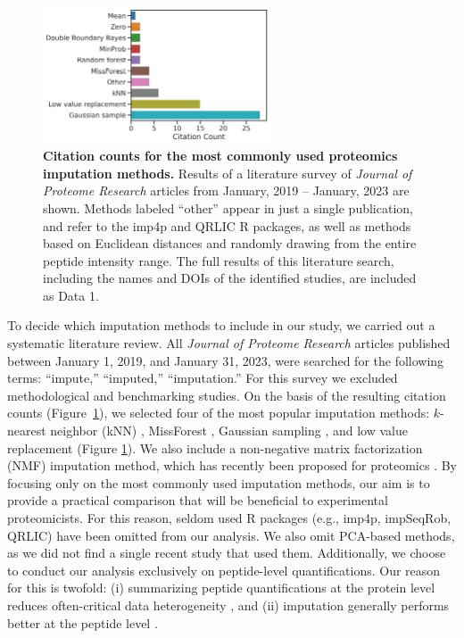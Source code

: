 \documentclass{article}
\begin{document}
\begin{figure}
  \begin{center}
    \includegraphics[width=0.6\textwidth]{figures/imp-lit-seq-results-update1.png}
  \end{center}
  \caption{{\bf Citation counts for the most commonly used proteomics imputation methods.} Results of a literature survey of \textit{Journal of Proteome Research} articles from January, 2019 -- January, 2023 are shown. Methods labeled ``other'' appear in just a single publication, and refer to the imp4p and QRLIC R packages, as well as methods based on Euclidean distances and randomly drawing from the entire peptide intensity range.  The full results of this literature search, including the names and DOIs of the identified studies, are included as Data 1. }
  \label{fig:citation-counts}
\end{figure} 

To decide which imputation methods to include in our study, we carried out a systematic literature review.  All \textit{Journal of Proteome Research} articles published between January 1, 2019, and January 31, 2023, were searched for the following terms: ``impute,'' ``imputed,'' ``imputation.'' For this survey we excluded methodological and benchmarking studies.  On the basis of the resulting citation counts (Figure~\ref{fig:citation-counts}), we selected four of the most popular imputation methods: $k$-nearest neighbor (kNN)  \cite{knn-impute}, MissForest \cite{missForest}, Gaussian sampling \cite{Perseus}, and low value replacement (Figure \ref{fig:citation-counts}).   We also include a non-negative matrix factorization (NMF) imputation method, which has recently been proposed for proteomics \cite{nmf-metabolomics, ms-impute, deep-impute}.  By focusing only on the most commonly used imputation methods, our aim is to provide a practical comparison that will be beneficial to experimental proteomicists. For this reason, seldom used R packages (e.g., imp4p, impSeqRob, QRLIC) have been omitted from our analysis. We also omit PCA-based methods, as we did not find a single recent study that used them. Additionally, we choose to conduct our analysis exclusively on peptide-level quantifications. Our reason for this is twofold: (i) summarizing peptide quantifications at the protein level reduces often-critical data heterogeneity \cite{humpty-dumpty}, and (ii) imputation generally performs better at the peptide level \cite{lazar}.
\end{document}
